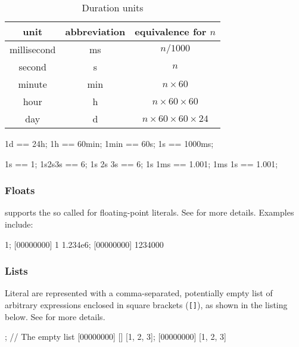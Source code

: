 \begin{table}
  \centering
  \begin{tabular}{|c|c|c|}
    \hline
    unit        & abbreviation & equivalence for $n$  \\
    \hline
    millisecond & ms           & $n / 1000$         \\
    second      & s            & $n$                \\
    minute      & min          & $n \times 60$           \\
    hour        & h            & $n \times 60 \times 60$      \\
    day         & d            & $n \times 60 \times 60 \times 24$ \\
    \hline
  \end{tabular}
  \caption{Duration units}
  \label{tab:duration}
\end{table}

\begin{urbiassert}
1d == 24h;
1h == 60min;
1min == 60s;
1s == 1000ms;

1s == 1;
1s2s3s == 6;
1s 2s 3s == 6;
1s 1ms == 1.001;
1ms 1s == 1.001;
\end{urbiassert}

\subsubsection{Floats}
\label{sec:us-syn-lit-float}

\us supports the so called  for
floating-point literals.  See  for more details.
Examples include:

\begin{urbiscript}
1;
[00000000] 1
1.234e6;
[00000000] 1234000
\end{urbiscript}

\subsubsection{Lists}
\label{sec:us-syn-lit-list}

Literal  are represented with a comma-separated, potentially
empty list of arbitrary expressions enclosed in square brackets
(\lstinline|[]|), as shown in the listing below.  See
 for more details.

\begin{urbiscript}
[]; // The empty list
[00000000] []
[1, 2, 3];
[00000000] [1, 2, 3]
\end{urbiscript}

